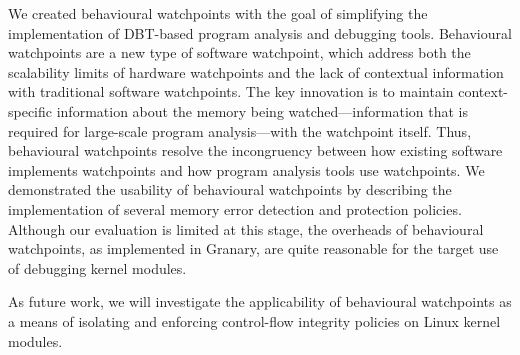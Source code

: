 \documentclass[letterpaper,twocolumn,10pt]{article}
\begin{document}
We created behavioural watchpoints with the goal of simplifying the implementation of DBT-based program analysis and debugging tools. Behavioural watchpoints are a new type of software watchpoint, which address both the scalability limits of hardware watchpoints and the lack of contextual information with traditional software watchpoints.  The key innovation is to maintain context-specific information about the memory being watched---information that is required for large-scale program analysis---with the watchpoint itself.  Thus, behavioural watchpoints resolve the incongruency between how existing software implements watchpoints and how program analysis tools use watchpoints. We demonstrated the usability of behavioural watchpoints by describing the implementation of several memory error detection and protection policies.  Although our evaluation is limited at this stage, the overheads of behavioural watchpoints, as implemented in Granary, are quite reasonable for the target use of debugging kernel modules.

As future work, we will investigate the applicability of behavioural watchpoints as a means of isolating and enforcing control-flow integrity policies on Linux kernel modules.








\end{document}
